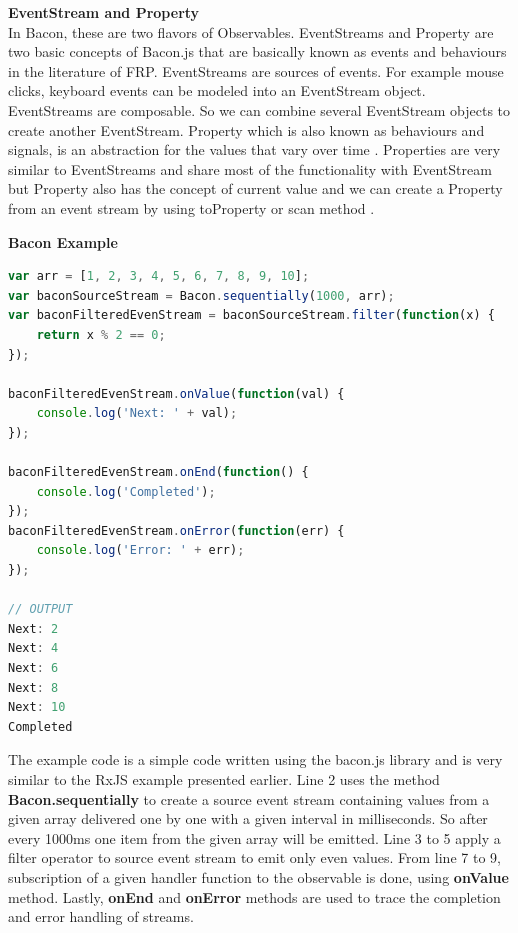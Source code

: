 \textbf{EventStream and Property}\\
In Bacon, these are two flavors of Observables. EventStreams and Property are two basic concepts of Bacon.js that are basically known as events and behaviours in the literature of FRP.
EventStreams are sources of events. For example mouse clicks, keyboard events can be modeled into an EventStream object. EventStreams are composable. So we can combine several EventStream objects to create another EventStream.
Property which is also known as behaviours and signals, is an abstraction for the values that vary over time \cite{GithubFRP}.
Properties are very similar to EventStreams and share most of the functionality with EventStream but Property also has the concept of current value and we can create a Property from an event stream by using toProperty or scan method \cite{BaconProperty}.

\textbf{Bacon Example}\\
\begin{lstlisting}[language=JavaScript, caption=Bacon.js Example , label={lst:Bacon_Simple_Example}]
var arr = [1, 2, 3, 4, 5, 6, 7, 8, 9, 10];
var baconSourceStream = Bacon.sequentially(1000, arr);
var baconFilteredEvenStream = baconSourceStream.filter(function(x) {
	return x % 2 == 0;
});

baconFilteredEvenStream.onValue(function(val) {
	console.log('Next: ' + val);
});

baconFilteredEvenStream.onEnd(function() {
	console.log('Completed');
});
baconFilteredEvenStream.onError(function(err) {
	console.log('Error: ' + err);
});

// OUTPUT
Next: 2
Next: 4
Next: 6
Next: 8
Next: 10
Completed

\end{lstlisting}

The example code is a simple code written using the bacon.js library and is very similar to the RxJS example presented earlier.
Line 2 uses the method \textbf{Bacon.sequentially} to create a source event stream containing values from a given array delivered one by one with a given interval in milliseconds. So after every 1000ms one item from the given array will be emitted. Line 3 to 5 apply a filter operator to source event stream to emit only even values. From line 7 to 9, subscription of a given handler function to the observable is done, using \textbf{onValue} method. Lastly, \textbf{onEnd} and \textbf{onError} methods are used to trace the completion and error handling of streams.

